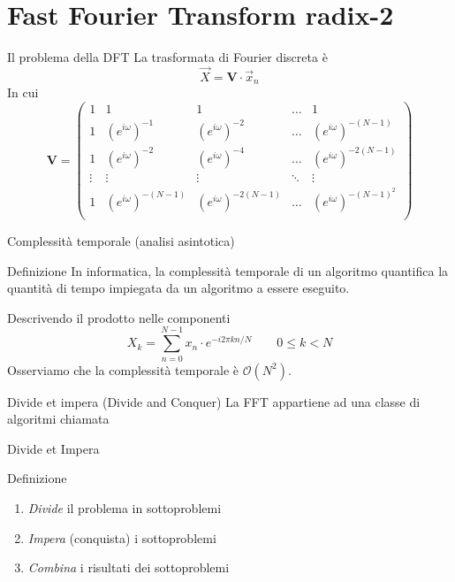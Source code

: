 \documentclass[10pt, xetex]{beamer}
\begin{document}
\section{Fast Fourier Transform {\small radix-2}}
\begin{frame}{Il problema della DFT}
    La trasformata di Fourier discreta \`e
    \[
        \vec{X} = \mathbf{V}\cdot\vec{x}_n
    \]
    In cui
    \[
        \mathbf{V} = 
        \begin{pmatrix}
        1      & 1                      & 1                       & \dots  & 1                        \\[1em]
        1      & (e^{i\omega})^{-1}     & (e^{i\omega})^{-2}      & \dots  & (e^{i\omega})^{-(N-1)}   \\[1em]
        1      & (e^{i\omega})^{-2}     & (e^{i\omega})^{-4}      & \dots  & (e^{i\omega})^{-2(N-1)}  \\[1em]
        \vdots & \vdots                 &  \vdots                 & \ddots & \vdots                   \\[1em]
        1      & (e^{i\omega})^{-(N-1)} & (e^{i\omega})^{-2(N-1)} & \dots  & (e^{i\omega})^{-(N-1)^2} \\[1em]
        \end{pmatrix}
    \]
\end{frame}

\begin{frame}{Complessit\`a temporale (analisi asintotica)}
    \begin{block}{Definizione}
        In informatica, la complessità temporale di un algoritmo quantifica la
        quantità di tempo impiegata da un algoritmo a essere eseguito.
    \end{block}
    Descrivendo il prodotto nelle componenti
    \[
        X_k = \sum_{n=0}^{N-1} x_n\cdot e^{-i2\pi kn/N}
        \qquad 0 \leq k < N
    \]
    Osserviamo che la complessit\`a temporale \`e \(\mathcal{O}(N^2)\).
\end{frame}

\begin{frame}{Divide et impera (Divide and Conquer)}
    La FFT appartiene ad una classe di algoritmi chiamata
    \begin{center}
        \Large Divide et Impera
    \end{center}

    \begin{block}{Definizione}
    \begin{enumerate}
        \item \emph{Divide} il problema in sottoproblemi
        \item \emph{Impera} (conquista) i sottoproblemi
        \item \emph{Combina} i risultati dei sottoproblemi
    \end{enumerate}
    \end{block}
\end{frame}
\end{document}

